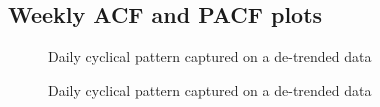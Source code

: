 \documentclass[
  letterpaper,
  DIV=11,
  numbers=noendperiod]{scrartcl}
\begin{document}
\pagebreak

\subsection{Weekly ACF and PACF plots}\label{weekly-acf-and-pacf-plots}

\begin{figure}


\caption{\label{fig-season-week-1}Daily cyclical pattern captured on a
de-trended data}

\end{figure}%

\begin{figure}


\caption{\label{fig-season-week-2}Daily cyclical pattern captured on a
de-trended data}

\end{figure}%
\end{document}
